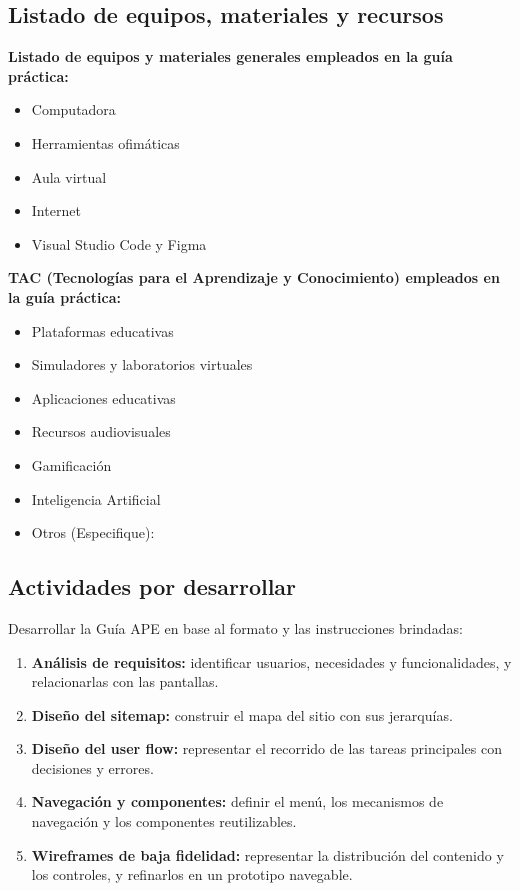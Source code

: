 \documentclass{article}
\begin{document}
\subsection{Listado de equipos, materiales y recursos}
\textbf{Listado de equipos y materiales generales empleados en la guía práctica:}
\begin{itemize}[leftmargin=1.5em, itemsep=3pt]
    \item Computadora
    \item Herramientas ofimáticas
    \item Aula virtual
    \item Internet
    \item Visual Studio Code y Figma
\end{itemize}

\textbf{TAC (Tecnologías para el Aprendizaje y Conocimiento) empleados en la guía práctica:}
\begin{itemize}[leftmargin=1.5em, itemsep=2pt]
    \item[$\square$] Plataformas educativas
    \item[$\square$] Simuladores y laboratorios virtuales
    \item[$\square$] Aplicaciones educativas
    \item[$\square$] Recursos audiovisuales
    \item[$\square$] Gamificación
    \item[$\blacksquare$] Inteligencia Artificial
    \item Otros (Especifique): \underline{\hspace{5cm}}
\end{itemize}

\subsection{Actividades por desarrollar}
Desarrollar la Guía APE en base al formato y las instrucciones brindadas:
\begin{enumerate}[leftmargin=1.5em, itemsep=3pt]
    \item \textbf{Análisis de requisitos:} identificar usuarios, necesidades y funcionalidades, y relacionarlas con las pantallas.
    \item \textbf{Diseño del sitemap:} construir el mapa del sitio con sus jerarquías.
    \item \textbf{Diseño del user flow:} representar el recorrido de las tareas principales con decisiones y errores.
    \item \textbf{Navegación y componentes:} definir el menú, los mecanismos de navegación y los componentes reutilizables.
    \item \textbf{Wireframes de baja fidelidad:} representar la distribución del contenido y los controles, y refinarlos en un prototipo navegable.
\end{enumerate}
\end{document}
